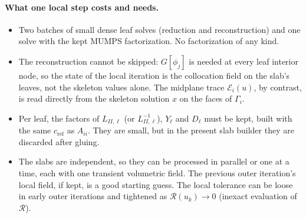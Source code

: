 \documentclass[11pt,a4paper]{article}
\theoremstyle{remark}\newtheorem{remark}{Remark}
\newcommand{\cR}{c_{\mathrm{ref}}}
\begin{document}
\paragraph{What one local step costs and needs.}
\begin{itemize}
  \item Two batches of small dense leaf solves (reduction and reconstruction)
    and one solve with the kept MUMPS factorization. No factorization of any
    kind.
  \item The reconstruction cannot be skipped: $G[\phi_j]$ is needed at every
    leaf interior node, so the state of the local iteration is the
    collocation field on the slab's leaves, not the skeleton values alone.
    The midplane trace $\mathcal E_i(u)$, by contrast, is read directly from
    the skeleton solution $x$ on the faces of $\Gamma_i$.
  \item Per leaf, the factors of $L_{II,\ell}$ (or $L_{II,\ell}^{-1}$), $Y_\ell$ and
    $D_\ell$ must be kept, built with the same $\cR$ as $A_{ii}$. They are small,
    but in the present slab builder they are discarded after gluing.
  \item The slabs are independent, so they can be processed in parallel or one
    at a time, each with one transient volumetric field. The previous outer
    iteration's local field, if kept, is a good starting guess. The local
    tolerance can be loose in early outer iterations and tightened as
    $\mathcal R(u_k)\to0$ (inexact evaluation of $\mathcal R$).
\end{itemize}
\end{document}
